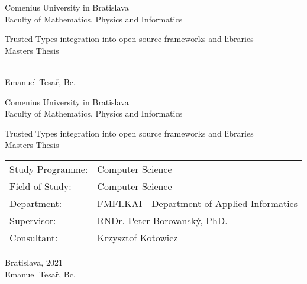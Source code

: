 \documentclass[12pt, twoside]{book}
\def\mfrok{2021}
\def\mfnazov{Trusted Types integration into open source frameworks and libraries}
\def\mftyp{Masters Thesis}
\def\mfautor{Emanuel Tesař, Bc.}
\def\mfskolitel{RNDr. Peter Borovanský, PhD.}
\def\mfkonzultant{Krzysztof Kotowicz}
\def\mfmiesto{Bratislava, \mfrok}
\def\mfodbor{Computer Science}
\def\program{Computer Science}
\def\mfpracovisko{ FMFI.KAI - Department of Applied Informatics }
\begin{document}
\frontmatter


\thispagestyle{empty}

\begin{center}
  \sc\large
  Comenius University in Bratislava\\
  Faculty of Mathematics, Physics and Informatics

  \vfill

  {\LARGE\mfnazov}\\
  \mftyp
\end{center}

\vfill

{\sc\large
  \noindent \mfrok\\
  \mfautor
}

\cleardoublepage


\thispagestyle{empty}
\noindent

\begin{center}
  \sc
  \large
  Comenius University in Bratislava\\
  Faculty of Mathematics, Physics and Informatics

  \vfill

  {\LARGE\mfnazov}\\
  \mftyp
\end{center}

\vfill

\noindent
\begin{tabular}{ll}
  Study Programme: & \program      \\
  Field of Study:  & \mfodbor      \\
  Department:      & \mfpracovisko \\
  Supervisor:      & \mfskolitel   \\
  Consultant:      & \mfkonzultant \\
\end{tabular}

\vfill


\noindent \mfmiesto\\
\mfautor

\cleardoublepage


\end{document}
